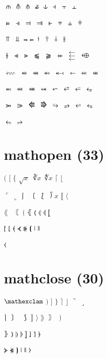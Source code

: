 \documentclass{article}
\begin{document}
$\forkv$ $\topfork$ $\mlcp$ $\forks$ $\forksnot$ $\shortlefttack$ $\shortdowntack$ $\shortuptack$ \par
$\vDdash$ $\dashV$ $\Dashv$ $\DashV$ $\varVdash$ $\Barv$ $\vBar$ $\vBarv$ \par
$\barV$ $\Vbar$ $\Not$ $\bNot$ $\revnmid$ $\cirmid$ $\midcir$ $\nhpar$ \par
$\parsim$ $\lllnest$ $\gggnest$ $\leqqslant$ $\geqqslant$ $\circleonleftarrow$ $\leftthreearrows$ $\leftarrowonoplus$ \par
$\longleftsquigarrow$ $\nvtwoheadleftarrow$ $\nVtwoheadleftarrow$ $\twoheadmapsfrom$ $\twoheadleftdbkarrow$ $\leftdotarrow$ $\nvleftarrowtail$ $\nVleftarrowtail$ \par
$\twoheadleftarrowtail$ $\nvtwoheadleftarrowtail$ $\nVtwoheadleftarrowtail$ $\leftarrowx$ $\leftcurvedarrow$ $\equalleftarrow$ $\bsimilarleftarrow$ $\leftarrowbackapprox$ \par
$\rightarrowgtr$ $\rightarrowsupset$ $\LLeftarrow$ $\RRightarrow$ $\bsimilarrightarrow$ $\rightarrowbackapprox$ $\similarleftarrow$ $\leftarrowapprox$ \par
$\leftarrowbsimilar$ $\rightarrowbsimilar$\par

\section*{mathopen (33)}

$\lparen$ $\lbrack$ $\lbrace$ $\sqrt{x}$ $\cuberoot{x}$ $\fourthroot{x}$ $\lceil$ $\lfloor$ \par
$\ulcorner$ $\llcorner$ $\lmoustache$ $\lbrbrak$ $\lbag$ $\longdivision{x}$ $\lBrack$ $\langle$ \par
$\lAngle$ $\Lbrbrak$ $\lgroup$ $\lBrace$ $\lParen$ $\llparenthesis$ $\llangle$ $\lbrackubar$ \par
$\lbrackultick$ $\lbracklltick$ $\langledot$ $\lparenless$ $\Lparengtr$ $\lblkbrbrak$ $\lvzigzag$ $\Lvzigzag$ \par
$\lcurvyangle$\par

\section*{mathclose (30)}

$\mathexclam$ $\rparen$ $\rbrack$ $\rbrace$ $\rceil$ $\rfloor$ $\urcorner$ $\lrcorner$ \par
$\rmoustache$ $\rbrbrak$ $\rbag$ $\rBrack$ $\rangle$ $\rAngle$ $\Rbrbrak$ $\rgroup$ \par
$\rBrace$ $\rParen$ $\rrparenthesis$ $\rrangle$ $\rbrackubar$ $\rbracklrtick$ $\rbrackurtick$ $\rangledot$ \par
$\rparengtr$ $\Rparenless$ $\rblkbrbrak$ $\rvzigzag$ $\Rvzigzag$ $\rcurvyangle$\par
\end{document}

